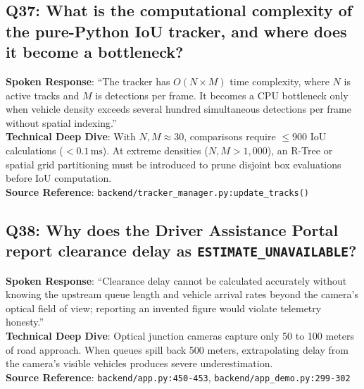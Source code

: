 \subsection*{Q37: What is the computational complexity of the pure-Python IoU tracker, and where does it become a bottleneck?}
\begin{interviewbox}
\textbf{Spoken Response}: ``The tracker has $O(N \times M)$ time complexity, where $N$ is active tracks and $M$ is detections per frame. It becomes a CPU bottleneck only when vehicle density exceeds several hundred simultaneous detections per frame without spatial indexing.''\\
\textbf{Technical Deep Dive}: With $N, M \approx 30$, comparisons require $\le 900$ IoU calculations ($< 0.1\,\text{ms}$). At extreme densities ($N, M > 1,000$), an R-Tree or spatial grid partitioning must be introduced to prune disjoint box evaluations before IoU computation.\\
\textbf{Source Reference}: \texttt{backend/tracker\_manager.py:update\_tracks()}
\end{interviewbox}

\subsection*{Q38: Why does the Driver Assistance Portal report clearance delay as \texttt{ESTIMATE\_UNAVAILABLE}?}
\begin{interviewbox}
\textbf{Spoken Response}: ``Clearance delay cannot be calculated accurately without knowing the upstream queue length and vehicle arrival rates beyond the camera's optical field of view; reporting an invented figure would violate telemetry honesty.''\\
\textbf{Technical Deep Dive}: Optical junction cameras capture only 50 to 100 meters of road approach. When queues spill back 500 meters, extrapolating delay from the camera's visible vehicles produces severe underestimation.\\
\textbf{Source Reference}: \texttt{backend/app.py:450-453}, \texttt{backend/app\_demo.py:299-302}
\end{interviewbox}

